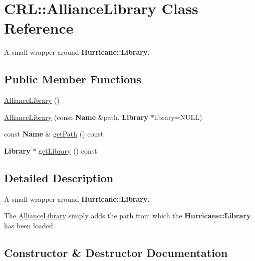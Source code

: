 \hypertarget{classCRL_1_1AllianceLibrary}{}\section{C\+RL\+:\+:Alliance\+Library Class Reference}
\label{classCRL_1_1AllianceLibrary}


A small wrapper around \textbf{ Hurricane\+::\+Library}.  


\subsection*{Public Member Functions}
\begin{DoxyCompactItemize}
\item 
\mbox{\hyperlink{classCRL_1_1AllianceLibrary_ad7394ba603e21e655d4518795650f042}{Alliance\+Library}} ()
\item 
\mbox{\hyperlink{classCRL_1_1AllianceLibrary_a1a0c9a0f2b74eaae859206e5338107a0}{Alliance\+Library}} (const \textbf{ Name} \&path, \textbf{ Library} $\ast$library=N\+U\+LL)
\item 
const \textbf{ Name} \& \mbox{\hyperlink{classCRL_1_1AllianceLibrary_a3be21e668a6a01085df037989eacf6f8}{get\+Path}} () const
\item 
\textbf{ Library} $\ast$ \mbox{\hyperlink{classCRL_1_1AllianceLibrary_abd54e8a070660030c6d2af8a239359b5}{get\+Library}} () const
\end{DoxyCompactItemize}


\subsection{Detailed Description}
A small wrapper around \textbf{ Hurricane\+::\+Library}. 

The \mbox{\hyperlink{classCRL_1_1AllianceLibrary}{Alliance\+Library}} simply adds the path from which the \textbf{ Hurricane\+::\+Library} has been loaded. 

\subsection{Constructor \& Destructor Documentation}
\mbox{\label{classCRL_1_1AllianceLibrary_ad7394ba603e21e655d4518795650f042}} 

